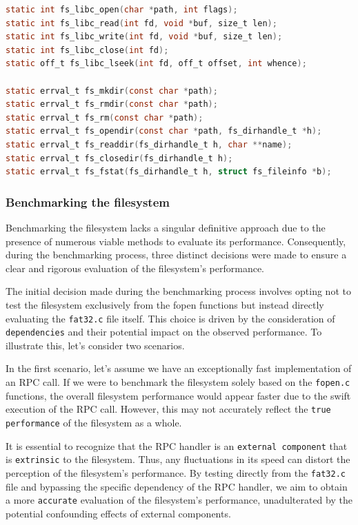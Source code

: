 {\begin{lstlisting}[caption={Function filled in libopen},captionpos=b,language=C,frame=single,breaklines]
static int fs_libc_open(char *path, int flags);
static int fs_libc_read(int fd, void *buf, size_t len);
static int fs_libc_write(int fd, void *buf, size_t len);
static int fs_libc_close(int fd);
static off_t fs_libc_lseek(int fd, off_t offset, int whence);

static errval_t fs_mkdir(const char *path);
static errval_t fs_rmdir(const char *path);
static errval_t fs_rm(const char *path);
static errval_t fs_opendir(const char *path, fs_dirhandle_t *h);
static errval_t fs_readdir(fs_dirhandle_t h, char **name);
static errval_t fs_closedir(fs_dirhandle_t h);
static errval_t fs_fstat(fs_dirhandle_t h, struct fs_fileinfo *b);
\end{lstlisting}

\subsubsection{Benchmarking the filesystem}

Benchmarking the filesystem lacks a singular definitive approach due to the presence of numerous viable methods to evaluate its performance. Consequently, during the benchmarking process, three distinct decisions were made to ensure a clear and rigorous evaluation of the filesystem's performance.

The initial decision made during the benchmarking process involves opting not to test the filesystem exclusively from the fopen functions but instead directly evaluating the \texttt{fat32.c} file itself. This choice is driven by the consideration of \texttt{dependencies} and their potential impact on the observed performance. To illustrate this, let's consider two scenarios.

In the first scenario, let's assume we have an exceptionally fast implementation of an RPC call. If we were to benchmark the filesystem solely based on the \texttt{fopen.c} functions, the overall filesystem performance would appear faster due to the swift execution of the RPC call. However, this may not accurately reflect the \texttt{true performance} of the filesystem as a whole.

It is essential to recognize that the RPC handler is an \texttt{external component} that is \texttt{extrinsic} to the filesystem. Thus, any fluctuations in its speed can distort the perception of the filesystem's performance. By testing directly from the \texttt{fat32.c} file and bypassing the specific dependency of the RPC handler, we aim to obtain a more \texttt{accurate} evaluation of the filesystem's performance, unadulterated by the potential confounding effects of external components.

}
